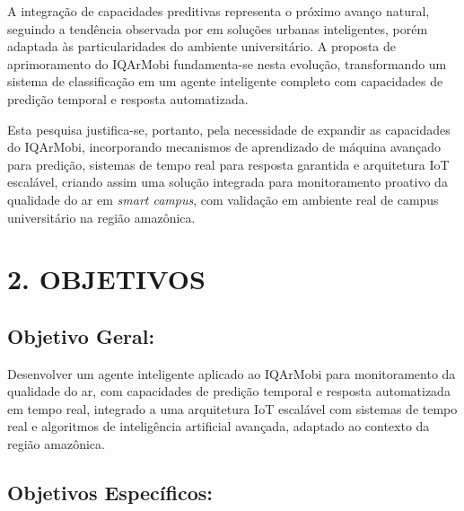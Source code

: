 \documentclass[12pt, a4paper]{article}
\begin{document}
A integração de capacidades preditivas representa o próximo avanço
natural, seguindo a tendência observada por \cite{kumar2023} em soluções
urbanas inteligentes, porém adaptada às particularidades do ambiente
universitário. A proposta de aprimoramento do IQArMobi fundamenta-se
nesta evolução, transformando um sistema de classificação em um agente
inteligente completo com capacidades de predição temporal e resposta
automatizada.

Esta pesquisa justifica-se, portanto, pela necessidade de expandir as
capacidades do IQArMobi, incorporando mecanismos de aprendizado de
máquina avançado para predição, sistemas de tempo real para resposta
garantida e arquitetura IoT escalável, criando assim uma solução
integrada para monitoramento proativo da qualidade do ar em
\textit{smart campus}, com validação em ambiente real de campus
universitário na região amazônica.
\section*{2. OBJETIVOS}

\subsection*{Objetivo Geral:}

Desenvolver um agente inteligente aplicado ao IQArMobi para monitoramento da qualidade do ar,
 com capacidades de predição temporal e resposta automatizada em tempo real, integrado a
uma arquitetura IoT escalável com sistemas de tempo real e algoritmos
de inteligência artificial avançada, adaptado ao contexto da região
amazônica.

\subsection*{Objetivos Específicos:}
\end{document}
